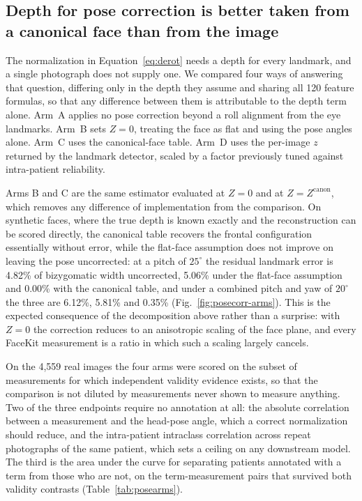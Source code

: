 \documentclass[11pt]{article}
\begin{document}
\subsection{Depth for pose correction is better taken from a canonical face than
from the image}
\label{sec:posecorr}

The normalization in Equation~\eqref{eq:derot} needs a depth for every landmark,
and a single photograph does not supply one. We compared four ways of answering
that question, differing only in the depth they assume and sharing all 120
feature formulas, so that any difference between them is attributable to the
depth term alone. Arm~A applies no pose correction beyond a roll alignment from
the eye landmarks. Arm~B sets $Z = 0$, treating the face as flat and using the
pose angles alone. Arm~C uses the canonical-face table. Arm~D uses the per-image
$z$ returned by the landmark detector, scaled by a factor previously tuned
against intra-patient reliability.

Arms B and C are the same estimator evaluated at $Z = 0$ and at
$Z = Z^{\mathrm{canon}}$, which removes any difference of implementation from
the comparison. On synthetic faces, where the true depth is known exactly and the
reconstruction can be scored directly, the canonical table recovers the frontal
configuration essentially without error, while the flat-face assumption does not
improve on leaving the pose uncorrected: at a pitch of $25^{\circ}$ the residual
landmark error is 4.82\% of bizygomatic width uncorrected, 5.06\% under the
flat-face assumption and 0.00\% with the canonical table, and under a combined
pitch and yaw of $20^{\circ}$ the three are 6.12\%, 5.81\% and 0.35\%
(Fig.~\ref{fig:posecorr-arms}). This is the
expected consequence of the decomposition above rather than a surprise: with
$Z = 0$ the correction reduces to an anisotropic scaling of the face plane, and
every FaceKit measurement is a ratio in which such a scaling largely cancels.

On the 4,559 real images the four arms were scored on the subset of measurements
for which independent validity evidence exists, so that the comparison is not
diluted by measurements never shown to measure anything. Two of the three
endpoints require no annotation at all: the absolute correlation between a
measurement and the head-pose angle, which a correct normalization should reduce,
and the intra-patient intraclass correlation across repeat photographs of the
same patient, which sets a ceiling on any downstream model. The third is the area
under the curve for separating patients annotated with a term from those who are
not, on the term-measurement pairs that survived both validity contrasts
(Table~\ref{tab:posearms}).
\end{document}
